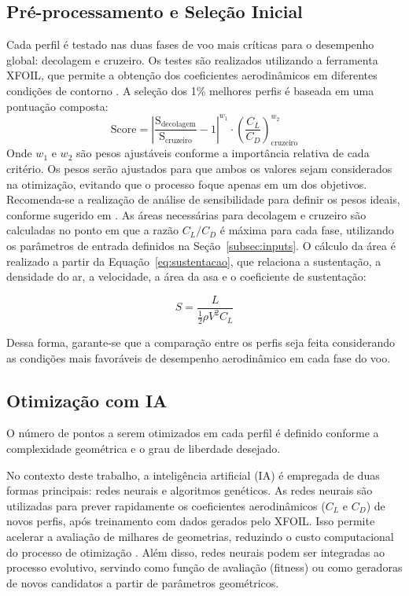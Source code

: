 \subsection{Pré-processamento e Seleção Inicial}
\label{sub:pontuacao}
Cada perfil é testado nas duas fases de voo mais críticas para o desempenho global: decolagem e cruzeiro. Os testes são realizados utilizando a ferramenta XFOIL, que permite a obtenção dos coeficientes aerodinâmicos em diferentes condições de contorno \cite{drela1989xfoil}. A seleção dos 1\% melhores perfis é baseada em uma pontuação composta:
\[
\text{Score} = \left| \frac{\text{S}_{\text{decolagem}}}{\text{S}_{\text{cruzeiro}}} - 1 \right|^{w_1} \cdot \left(\frac{C_L}{C_D}\right)_{\text{cruzeiro}}^{w_2}
\]
Onde \(w_1\) e \(w_2\) são pesos ajustáveis conforme a importância relativa de cada critério. Os pesos serão ajustados para que ambos os valores sejam considerados na otimização, evitando que o processo foque apenas em um dos objetivos. Recomenda-se a realização de análise de sensibilidade para definir os pesos ideais, conforme sugerido em \cite{oliveira2023, hasan2024}.
As áreas necessárias para decolagem e cruzeiro são calculadas no ponto em que a razão \(C_L/C_D\) é máxima para cada fase, utilizando os parâmetros de entrada definidos na Seção~\ref{subsec:inputs}. O cálculo da área é realizado a partir da Equação~\eqref{eq:sustentacao}, que relaciona a sustentação, a densidade do ar, a velocidade, a área da asa e o coeficiente de sustentação:

\[
 S = \frac{L}{\frac{1}{2} \rho V^2 C_L}
\]

Dessa forma, garante-se que a comparação entre os perfis seja feita considerando as condições mais favoráveis de desempenho aerodinâmico em cada fase do voo.

\subsection{Otimização com IA}
\label{subsec:otimizacao}
O número de pontos a serem otimizados em cada perfil é definido conforme a complexidade geométrica e o grau de liberdade desejado.

No contexto deste trabalho, a inteligência artificial (IA) é empregada de duas formas principais: redes neurais e algoritmos genéticos. As redes neurais são utilizadas para prever rapidamente os coeficientes aerodinâmicos (\(C_L\) e \(C_D\)) de novos perfis, após treinamento com dados gerados pelo XFOIL. Isso permite acelerar a avaliação de milhares de geometrias, reduzindo o custo computacional do processo de otimização \cite{wu2024, goodfellow2016deep}. Além disso, redes neurais podem ser integradas ao processo evolutivo, servindo como função de avaliação (fitness) ou como geradoras de novos candidatos a partir de parâmetros geométricos.

